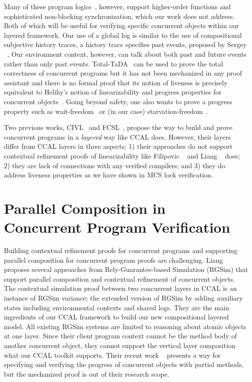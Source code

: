 Many of these program logics~\cite{Turon13popl,iris15}, however, support 
higher-order functions 
and sophisticated non-blocking synchronization,
which our work does not address.
Both of which will be
useful for verifying specific concurrent objects within our layered
framework. 
Our use of a global log is similar to the use of compositional
subjective history traces, a history trace specifies past events, proposed by Sergey \etal~\cite{sergey15},
Our environment context, however, can talk about both past and future events rather than only past events.
Total-TaDA~\cite{pinto16} can be used to prove
the total correctness of concurrent programs but it has not been
mechanized in any proof assistant and there is no formal proof that
its notion of liveness is precisely equivalent to Helihy's notion of
linearizability and progress properties for concurrent
objects~\cite{Herlihy08book}. 
Going
beyond safety, one also wants to prove a progress property such as
wait-freedom~\cite{herlihy91:waitfree} or (in our case)
starvation-freedom~\cite{Herlihy08book}.

Two previous works, CIVL~\cite{civl15} and FCSL~\cite{sergey15pldi},
propose the way to build and prove concurrent programs in a \textit{layered} way like CCAL does. 
However, their layers differ from CCAL layers in three aspects;
1) their approaches do not support contextual refinement proofs of linearizability like Filipovic \etal~\cite{filipovic10} and Liang \etal~\cite{liang13} does;
2) they are lack of connections with any verified compilers; and
3) they do address liveness properties as we have shown in MCS lock verification.


\section{Parallel Composition in Concurrent Program Verification}
\label{chatper:related:sec:parallel-composition-in-concurrent-program-verification}

Building contextual refinement proofs for concurrent programs and supporting parallel composition for concurrent program proofs 
are challenging.
Liang \etal~\cite{RGSim,Liang14lics,lili16, liang:2017} 
proposes several approaches from Rely-Guarantee-based Simulation (RGSim) 
that support parallel
composition and  contextual refinement of concurrent
objects.
The contextual simulation proof between two concurrent layers in CCAL 
is an instance of RGSim variance; the extended version of RGSim by adding auxiliary states including environmental contexts and shared logs. 
They are the main ingredients of our CCAL framework 
to build our new  compositional
layered model.
All existing RGSim systems are limited to reasoning
about atomic objects at one layer.
Since their client program context cannot 
be the method body of another concurrent object, 
they cannot
support the vertical layer composition what our CCAL toolkit supports.
Their recent work \etal~\cite{liang:2017} presents a way for specifying and verifying the progress of concurrent objects with partial methods, but the mechanized proof is out of their research scope. 

